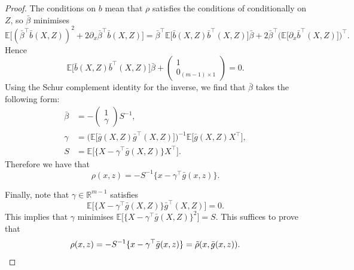 \documentclass[aos]{imsart}
\newcommand{\R}{\mathbb{R}}
\newcommand{\E}{\mathbb{E}}
\begin{document}
\begin{proof}
		
		The conditions on $b$ mean that $\rho$ satisfies the conditions of \citet[Prop.~1]{CoxSpline} conditionally on $Z$, so $\bar \beta$ minimises
		\begin{equation*}
			\E\big[(\bar \beta^{\top} \bar b(X,Z))^2+2\partial_x \bar\beta^{\top} \bar b(X,Z)\big]= \bar \beta^{\top} \E \big[\bar b(X,Z)\bar b^{\top}(X,Z)\big] \bar \beta + 2\bar \beta^{\top} \Big(\E\big[\partial_x \bar b^{\top}(X,Z)\big]\Big)^{\top}.
		\end{equation*}
		Hence \begin{equation*}
			\E \big[\bar b(X,Z)\bar b^{\top}(X,Z)\big] \bar\beta + \begin{pmatrix}
				1 \\ 0_{(m-1)\times 1}
			\end{pmatrix} = 0 \label{eqn:betadefiningequation}.
		\end{equation*}
		Using the Schur complement identity for the inverse, we find that $\bar\beta$ takes the following form:
		\begin{align*}
			\bar \beta &= -\begin{pmatrix}
				1 \\ \gamma  
			\end{pmatrix}S^{-1},\\
			\gamma &= \Big(\E\big[\bar g(X,Z)\bar g^{\top}(X,Z)\big]\Big)^{-1} \E\big[\bar g(X,Z)X^{\top}\big],\\
			S &= \E\big[\big\{X-\gamma^{\top} \bar g(X,Z)\big\}X^{\top}\big].
		\end{align*}
		Therefore we have that
		\begin{equation*}
			\rho(x,z) = - S^{-1} \{x - \gamma^{\top} \bar g(x,z)\}.
		\end{equation*}
		
		Finally, note that $\gamma\in \R^{m-1}$ satisfies
		\begin{equation*}
			\E\big[\big\{X-\gamma^{\top}\bar g(X,Z)\big\}\bar g^{\top}(X,Z)\big] = 0.
		\end{equation*}
		This implies that $\gamma$ minimises $\E\big[\{X-\gamma^{\top}\bar g(X,Z)\}^2\big] = S$.
		This suffices to prove that
		\begin{equation*}
			\rho(x,z)= - S^{-1} \{x - \gamma^{\top} \bar g(x,z)\} = \tilde \rho(x,\bar g(x,z)). \qedhere
		\end{equation*} 
	\end{proof}
	
\end{document}
